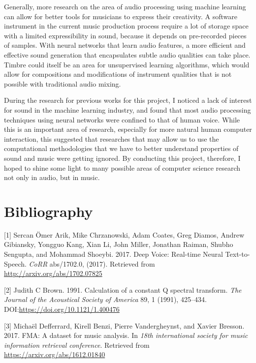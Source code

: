 \documentclass[12pt,a4paper,]{report}
\begin{document}
Generally, more research on the area of audio processing using machine
learning can allow for better tools for musicians to express their
creativity. A software instrument in the current music production
process require a lot of storage space with a limited expressibility in
sound, because it depends on pre-recorded pieces of samples. With neural
networks that learn audio features, a more efficient and effective sound
generation that encapsulates subtle audio qualities can take place.
Timbre could itself be an area for unsupervised learning algorithms,
which would allow for compositions and modifications of instrument
qualities that is not possible with traditional audio mixing.

During the research for previous works for this project, I noticed a
lack of interest for sound in the machine learning industry, and found
that most audio processing techniques using neural networks were
confined to that of human voice. While this is an important area of
research, especially for more natural human computer interaction, this
suggested that researches that may allow us to use the computational
methodologies that we have to better understand properties of sound and
music were getting ignored. By conducting this project, therefore, I
hoped to shine some light to many possible areas of computer science
research not only in audio, but in music.

\chapter*{Bibliography}

\hypertarget{refs}{}
\leavevmode\hypertarget{ref-DBLP:journalsux2fcorrux2fArikCCDGKLMRSS17}{}%
{[}1{]} Sercan Ömer Arik, Mike Chrzanowski, Adam Coates, Greg Diamos,
Andrew Gibiansky, Yongguo Kang, Xian Li, John Miller, Jonathan Raiman,
Shubho Sengupta, and Mohammad Shoeybi. 2017. Deep Voice: Real-time
Neural Text-to-Speech. \emph{CoRR} abs/1702.0, (2017). Retrieved from
\url{http://arxiv.org/abs/1702.07825}

\leavevmode\hypertarget{ref-doi:10.1121ux2f1.400476}{}%
{[}2{]} Judith C Brown. 1991. Calculation of a constant Q spectral
transform. \emph{The Journal of the Acoustical Society of America} 89, 1
(1991), 425--434. DOI:\url{https://doi.org/10.1121/1.400476}

\leavevmode\hypertarget{ref-fma_dataset}{}%
{[}3{]} Michaël Defferrard, Kirell Benzi, Pierre Vandergheynst, and
Xavier Bresson. 2017. FMA: A dataset for music analysis. In \emph{18th
international society for music information retrieval conference}.
Retrieved from \url{https://arxiv.org/abs/1612.01840}
\end{document}
